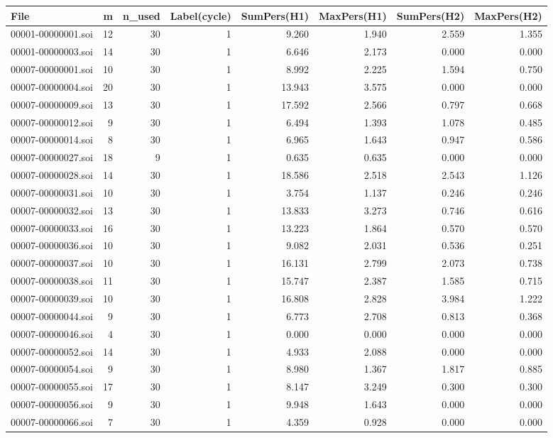 \begin{tabular}{lrrrrrrr}
\toprule
File & m & n\_used & Label(cycle) & SumPers(H1) & MaxPers(H1) & SumPers(H2) & MaxPers(H2) \\
\midrule
00001-00000001.soi & 12 & 30 & 1 & 9.260 & 1.940 & 2.559 & 1.355 \\
00001-00000003.soi & 14 & 30 & 1 & 6.646 & 2.173 & 0.000 & 0.000 \\
00007-00000001.soi & 10 & 30 & 1 & 8.992 & 2.225 & 1.594 & 0.750 \\
00007-00000004.soi & 20 & 30 & 1 & 13.943 & 3.575 & 0.000 & 0.000 \\
00007-00000009.soi & 13 & 30 & 1 & 17.592 & 2.566 & 0.797 & 0.668 \\
00007-00000012.soi & 9 & 30 & 1 & 6.494 & 1.393 & 1.078 & 0.485 \\
00007-00000014.soi & 8 & 30 & 1 & 6.965 & 1.643 & 0.947 & 0.586 \\
00007-00000027.soi & 18 & 9 & 1 & 0.635 & 0.635 & 0.000 & 0.000 \\
00007-00000028.soi & 14 & 30 & 1 & 18.586 & 2.518 & 2.543 & 1.126 \\
00007-00000031.soi & 10 & 30 & 1 & 3.754 & 1.137 & 0.246 & 0.246 \\
00007-00000032.soi & 13 & 30 & 1 & 13.833 & 3.273 & 0.746 & 0.616 \\
00007-00000033.soi & 16 & 30 & 1 & 13.223 & 1.864 & 0.570 & 0.570 \\
00007-00000036.soi & 10 & 30 & 1 & 9.082 & 2.031 & 0.536 & 0.251 \\
00007-00000037.soi & 10 & 30 & 1 & 16.131 & 2.799 & 2.073 & 0.738 \\
00007-00000038.soi & 11 & 30 & 1 & 15.747 & 2.387 & 1.585 & 0.715 \\
00007-00000039.soi & 10 & 30 & 1 & 16.808 & 2.828 & 3.984 & 1.222 \\
00007-00000044.soi & 9 & 30 & 1 & 6.773 & 2.708 & 0.813 & 0.368 \\
00007-00000046.soi & 4 & 30 & 1 & 0.000 & 0.000 & 0.000 & 0.000 \\
00007-00000052.soi & 14 & 30 & 1 & 4.933 & 2.088 & 0.000 & 0.000 \\
00007-00000054.soi & 9 & 30 & 1 & 8.980 & 1.367 & 1.817 & 0.885 \\
00007-00000055.soi & 17 & 30 & 1 & 8.147 & 3.249 & 0.300 & 0.300 \\
00007-00000056.soi & 9 & 30 & 1 & 9.948 & 1.643 & 0.000 & 0.000 \\
00007-00000066.soi & 7 & 30 & 1 & 4.359 & 0.928 & 0.000 & 0.000 \\

\end{tabular}
